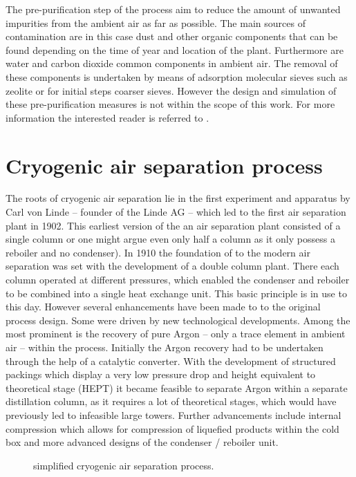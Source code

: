     The pre-purification step of the process aim to reduce the amount of unwanted impurities
    from the ambient air as far as possible. The main sources of contamination are in this case
    dust and other organic components that can be found depending on the time of year and
    location of the plant. Furthermore are water and carbon dioxide common components in
    ambient air. The removal of these components is undertaken by means of adsorption molecular
    sieves such as zeolite or for initial steps coarser sieves. However the design and simulation
    of these pre-purification measures is not within the scope of this work. For more information
    the interested reader is referred to \cite{Acharya.1996}.


\section{Cryogenic air separation process }	
    The roots of cryogenic air separation lie in the first experiment and apparatus by Carl von Linde -- founder of the
    Linde AG -- which led to the first air separation plant in 1902. This earliest version of the an air separation plant
    consisted of a single column or one might argue even only half a column as it only possess a reboiler and no condenser).
    In 1910 the foundation of to the modern air separation was set with the development of a double column plant. There
    each column operated at different pressures, which enabled the condenser and reboiler to be combined into a
    single heat exchange unit. This basic principle is in use to this day. However several enhancements have been made to
    to the original process design. Some were driven by new technological developments. Among the most prominent is the
    recovery of pure Argon -- only a trace element in ambient air -- within the process. Initially the Argon recovery
    had to be undertaken through the help of a catalytic converter. With the development of structured packings which
    display a very low pressure drop and height equivalent to theoretical stage (HEPT) it became feasible to separate
    Argon within a separate distillation column, as it requires a lot of theoretical stages, which would have
    previously led to infeasible large towers. Further advancements include internal compression which allows
    for compression of liquefied products within the cold box and more advanced designs of the condenser / reboiler unit.

    \begin{figure}
        \centering
        
        \caption{simplified cryogenic air separation process.}
        \label{fig:ASU_simple_coco}
    \end{figure}

